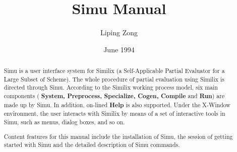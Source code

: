 \setcounter{secnumdepth}{3}
\setcounter{tocdepth}{3}
\topsep=0.1cm
\parsep=0.1cm
\itemsep=0.0cm
\newenvironment{nquote}[1]%
{\list{}{\leftmargin=#1}\item[]}%
{\endlist}






\begin{sloppypar}

\title{Simu Manual}

\author{Liping Zong}

\date{June 1994}
\maketitle
\thispagestyle{empty}

\begin{abstract}

Simu is a user interface system for Similix (a Self-Applicable Partial
Evaluator for a Large Subset of Scheme). The whole procedure of
partial evaluation using Similix is directed through Simu.  According
to the Similix working process model, six main components ({\bf
System, Preprocess, Specialize, Cogen, Compile} and {\bf Run}) are
made up by Simu. In addition, on-lined {\bf Help} is also
supported. Under the X-Window environment, the user interacts with
Similix by means of a set of interactive tools in Simu, such as menus,
dialog boxes, and so on.

Content features for this manual include the installation of Simu, the
session of getting started with Simu and the detailed description of
Simu commands.

\end{abstract}

\tableofcontents


\end{sloppypar}
